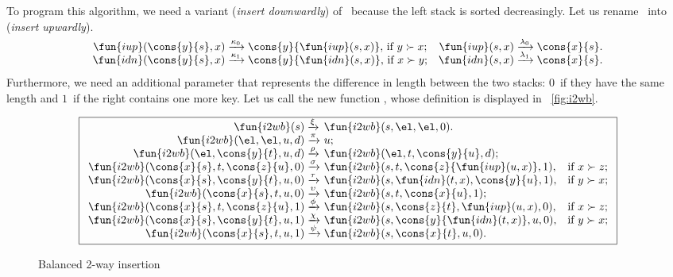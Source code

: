 To program this algorithm, we need a variant
 (\emph{insert downwardly})
of~ because the left stack is sorted
decreasingly. Let us rename~
into~ (\emph{insert upwardly}).
\begin{equation*}
\begin{array}{@{}r@{\;}l@{\;}lr@{\;}l@{\;}l@{}}
  \fun{iup}(\cons{y}{s},x)
& \xrightarrow{\smash{\kappa_0}}
& \cons{y}{\fun{iup}(s,x)},\,\text{if \(y \succ x\)};
& \fun{iup}(s,x)
& \xrightarrow{\smash{\lambda_0}} & \cons{x}{s}.\\
  \fun{idn}(\cons{y}{s},x)
& \xrightarrow{\smash{\kappa_1}}
& \cons{y}{\fun{idn}(s,x)},\,\text{if \(x \succ y\)};
& \fun{idn}(s,x)
& \xrightarrow{\smash{\lambda_1}} & \cons{x}{s}.
\end{array}
\end{equation*}
Furthermore, we need an additional parameter that represents the
difference in length between the two stacks: \(0\)~if they have the
same length and \(1\)~if the right contains one more key. Let us call
the new function
, whose
definition is displayed in \fig~\vref{fig:i2wb}.
\begin{figure}[t]
\begin{equation*}
\boxed{%
\begin{array}{r@{\;}l@{\;}ll}
\fun{i2wb}(s)
& \xrightarrow{\smash{\xi}} & \fun{i2wb}(s,\el,\el,0).\\
\fun{i2wb}(\el,\el,u,d)
& \xrightarrow{\smash{\pi}} & u;\\
\fun{i2wb}(\el,\cons{y}{t},u,d)
& \xrightarrow{\smash{\rho}} & \fun{i2wb}(\el,t,\cons{y}{u},d);\\
\fun{i2wb}(\cons{x}{s},t,\cons{z}{u},0)
& \xrightarrow{\smash{\sigma}} &
\fun{i2wb}(s,t,\cons{z}{\fun{iup}(u,x)},1),
& \text{if \(x \succ z\)};\\
\fun{i2wb}(\cons{x}{s},\cons{y}{t},u,0)
& \xrightarrow{\smash{\tau}} &
\fun{i2wb}(s,\fun{idn}(t,x),\cons{y}{u},1),
& \text{if \(y \succ x\)};\\
\fun{i2wb}(\cons{x}{s},t,u,0)
& \xrightarrow{\smash{\upsilon}} & \fun{i2wb}(s,t,\cons{x}{u},1);\\
\fun{i2wb}(\cons{x}{s},t,\cons{z}{u},1)
& \xrightarrow{\smash{\phi}}
& \fun{i2wb}(s,\cons{z}{t},\fun{iup}(u,x),0),
& \text{if \(x \succ z\)};\\
\fun{i2wb}(\cons{x}{s},\cons{y}{t},u,1)
& \xrightarrow{\smash{\chi}}
& \fun{i2wb}(s,\cons{y}{\fun{idn}(t,x)},u,0),
& \text{if \(y \succ x\)};\\
\fun{i2wb}(\cons{x}{s},t,u,1) & \xrightarrow{\smash{\psi}} &
\fun{i2wb}(s,\cons{x}{t},u,0).
\end{array}}
\end{equation*}
\caption{Balanced 2-way insertion}
\label{fig:i2wb}
\end{figure}

